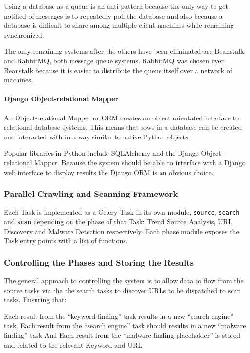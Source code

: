 Using a database as a queue is an anti-pattern because the only way to get notified of messages is to repeatedly poll the database and also because a database is difficult to share among multiple client machines while remaining synchronized.

The only remaining systems after the others have been eliminated are Beanstalk and RabbitMQ, both message queue systems. RabbitMQ was chosen over Beanstalk because it is easier to distribute the queue itself over a network of machines.

\paragraph{Django Object-relational Mapper} %
An Object-relational Mapper or ORM creates an object orientated interface to relational database systems.  This means that rows in a database can be created and interacted with in a way similar to native Python objects

Popular libraries in Python include SQLAlchemy and the Django Object-relational Mapper. Because the system should be able to interface with a Django web interface to display results the Django ORM is an obvious choice.

\subsubsection{Parallel Crawling and Scanning Framework}
Each Task is implemented as a Celery Task in its own module, \verb`source`, \verb`search` and \verb`scan` depending on the phase of that Task: Trend Source Analysis, URL Discovery and Malware Detection respectively. Each phase module exposes the Task entry points with a list of functions.

\subsubsection{Controlling the Phases and Storing the Results}
The general approach to controlling the system is to allow data to flow from the source tasks via the the search tasks to discover URLs to be dispatched to scan tasks. Ensuring that:

Each result from the ``keyword finding'' task results in a new ``search engine'' task.
Each result from the ``search engine'' task should results in a new ``malware finding'' task
And Each result from the ``malware finding placeholder'' is stored and related to the relevant Keyword and URL.

